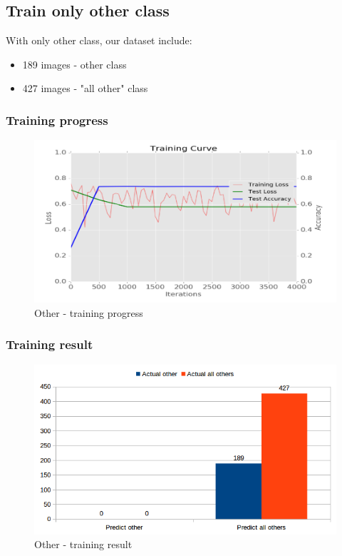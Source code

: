 \documentclass[11pt]{article}
\begin{document}
\subsection{Train only other class}
With only other class, our dataset include: 
\begin{itemize}
\item 189 images - other class
\item 427 images - "all other" class
\end{itemize}

\subsubsection{Training progress}

\begin{figure}[H]
\centering
\includegraphics[width=1\textwidth]{images/train_only_other}
\caption{Other - training progress}
\end{figure}

\subsubsection{Training result}

\begin{figure}[H]
\centering
\includegraphics[width=1\textwidth]{images/other}
\caption{Other - training result}
\end{figure}
\end{document}

